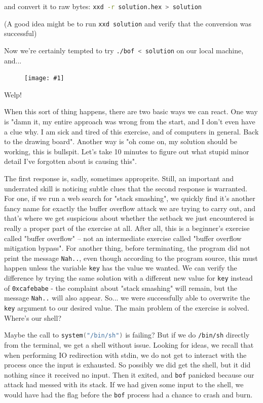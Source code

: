 \documentclass{article}
\newcommand{\displayimage}[1] {
\begin{figure}[H]
    \centering
    \texttt{[image: \#1]} 
\end{figure}
}
\newcommand{\xcode}[2]{\colorbox{ubuntuback}{\lstinline[language=#1]|#2|}}
\newcommand{\code}[1]{\colorbox{ubuntuback}{\texttt{#1}}}
\begin{document}


and convert it to raw bytes: \xcode{bash}{xxd -r solution.hex > solution}

(A good idea might be to run \xcode{bash}{xxd solution} and verify that the conversion was successful)

Now we're certainly tempted to try \xcode{bash}{./bof < solution} on our local machine, and...

\displayimage{./exercises/02_bof/local_test.png}

Welp! 

When this sort of thing happens, there are two basic ways we can react. One way is "damn it, my entire approach was wrong from the start, and I don't even have a clue why. I am sick and tired of this exercise, and of computers in general. Back to the drawing board". Another way is "oh come on, my solution should be working, this is bullspit. Let's take 10 minutes to figure out what stupid minor detail I've forgotten about is causing this".

The first response is, sadly, sometimes approprite. Still, an important and underrated skill is noticing subtle clues that the second response is warranted. For one, if we run a web search for "stack smashing", we quickly find it's another fancy name for exactly the buffer overflow attack we are trying to carry out, and that's where we get suspicious about whether the setback we just encountered is really a proper part of the exercise at all. After all, this is a beginner's exercise called "buffer overflow" -- not an intermediate exercise called "buffer overflow mitigation bypass". For another thing, before terminating, the program did not print the message \xcode{bash}{Nah..}, even though according to the program source, this must happen unless the variable \xcode{C}{key} has the value we wanted. We can verify the difference by trying the same solution with a different new value for \xcode{C}{key} instead of \code{0xcafebabe} - the complaint about "stack smashing" will remain, but the message \xcode{bash}{Nah..} will also appear. So... we were successfully able to overwrite the \xcode{C}{key} argument to our desired value. The main problem of the exercise is solved. Where's our shell?

        Maybe the call to \xcode{C}{system("/bin/sh")} is failing? But if we do \xcode{bash}{/bin/sh} directly from the terminal, we get a shell without issue. Looking for ideas, we recall that when performing IO redirection with stdin, we do not get to interact with the process once the input is exhausted. So possibly we did get the shell, but it did nothing since it received no input. Then it exited, and \code{bof} panicked because our attack had messed with its stack. If we had given some input to the shell, we would have had the flag before the \code{bof} process had a chance to crash and burn.
\end{document}
